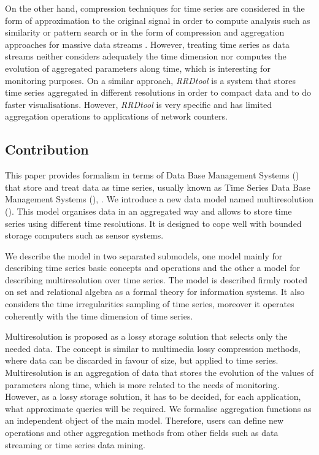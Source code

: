 On the other hand, compression techniques for time series are
considered in the form of approximation to the original signal in
order to compute analysis such as similarity or pattern search
\cite{fu11,keogh01,last01} or in the form of compression and
aggregation approaches for massive data streams
\cite{cormode08:pods,bonnet01}. However, treating time series as data
streams neither considers adequately the time dimension nor computes
the evolution of aggregated parameters along time, which is
interesting for monitoring purposes.  On a similar approach,
\emph{RRDtool} \cite{rrdtool} is a system that stores time series
aggregated in different resolutions in order to compact data and to do
faster visualisations. However, \emph{RRDtool} is very specific and
has limited aggregation operations to applications of network
counters.



\subsection{Contribution}



This paper provides formalism in terms of Data Base Management Systems
() that store and treat data as time series, usually known
as Time Series Data Base Management Systems (),
\cite{dreyer94,last01}.  We introduce a new data model named
multiresolution  (). This model organises data
in an aggregated way and allows to store time series using different
time resolutions. It is designed to cope well with bounded storage
computers such as sensor systems.

We describe the model in two separated submodels, one 
model mainly for describing time series basic concepts and operations
and the other a  model for describing multiresolution over
time series. The model is described firmly rooted on set and
relational algebra  as a formal theory
for information systems.  It also considers the time irregularities
sampling of time series, moreover it operates coherently with the time
dimension of time series.



Multiresolution is proposed as a lossy storage solution that selects
only the needed data. The concept is similar to multimedia lossy
compression methods, where data can be discarded in favour of size,
but applied to time series.  Multiresolution is an aggregation of data
that stores the evolution of the values of parameters along time,
which is more related to the needs of monitoring. However, as a lossy
storage solution, it has to be decided, for each application, what
approximate queries will be required.  We formalise aggregation
functions as an independent object of the main model. Therefore, users
can define new operations and other aggregation methods from other
fields such as data streaming or time series data mining.


